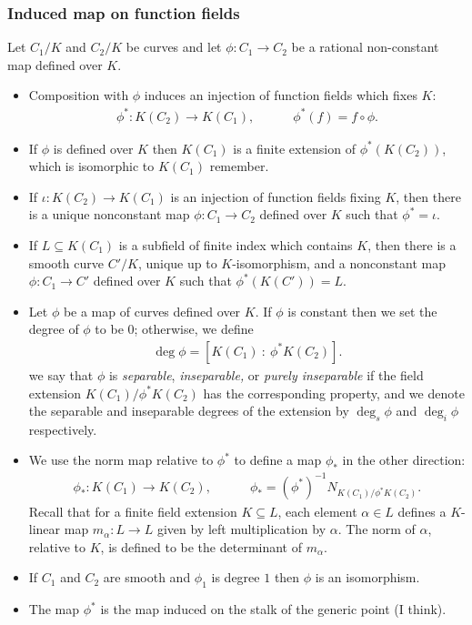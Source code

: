 	\subsubsection{Induced map on function fields}
	Let $C_1/K$ and $C_2/K$ be curves and let $\phi:C_1\to C_2$ be a rational non-constant map defined over $K$.
	\begin{itemize}
		\item Composition with $\phi$ induces an injection of function fields which fixes $K$:
			\begin{align*}
				\phi^*:K(C_2)\to K(C_1), \hspace{3em} \phi^*(f) = f\circ \phi.
			\end{align*}
		\item If $\phi$ is defined over $K$ then $K(C_1)$ is a finite extension of $\phi^*(K(C_2))$, which is isomorphic to $K(C_1)$ remember.
		\item If $\iota: K(C_2)\to K(C_1)$ is an injection of function fields fixing $K$, then there is a unique nonconstant map $\phi:C_1\to C_2$ defined over $K$ such that $\phi^* = \iota$.
		\item If $L \subseteq K(C_1)$ is a subfield of finite index which contains $K$, then there is a smooth curve $C'/K$, unique up to $K$-isomorphism, and a nonconstant map $\phi:C_1 \to C'$ defined over $K$ such that $\phi^*(K(C')) = L$.
		\item Let $\phi$ be a map of curves defined over $K$. If $\phi$ is constant then we set the degree of $\phi$ to be 0; otherwise, we define
			\begin{align*}
				\deg \phi = [ K(C_1)~:~\phi^*K(C_2) ].
			\end{align*}
		we say that $\phi$ is \emph{separable}, \emph{inseparable,} or \emph{purely inseparable} if the field extension $K(C_1)/\phi^*K(C_2)$ has the corresponding property, and we denote the separable and inseparable degrees of the extension by $\deg_s\phi$ and $\deg_i\phi$ respectively.
		\item We use the norm map relative to $\phi^*$ to define a map $\phi_*$ in the other direction:
			\begin{align*}
				\phi_*:K(C_1)\to K(C_2), \hspace{3em} \phi_* = (\phi^*)^{-1}N_{K(C_1)/\phi^*K(C_2)}.
			\end{align*}
		Recall that for a finite field extension $K \subseteq L$, each element $\alpha \in L$ defines a $K$-linear map $m_\alpha:L\to L$ given by left multiplication by $\alpha$. The norm of $\alpha$, relative to $K$, is defined to be the determinant of $m_\alpha$.
	    \item If $C_1$ and $C_2$ are smooth and $\phi_1$ is degree $1$ then $\phi$ is an isomorphism.
	    \item The map $\phi^*$ is the map induced on the stalk of the generic point (I think).
	\end{itemize}


